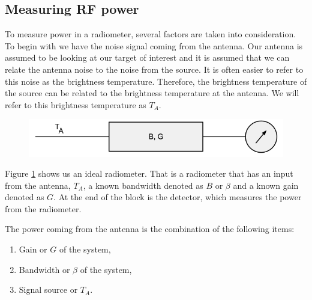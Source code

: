 \subsection{Measuring RF power}

To measure power in a radiometer, several factors are taken into consideration.  To begin with we have the noise signal coming from the antenna.  Our antenna is assumed to be looking at our target of interest and it is assumed that we can relate the antenna noise to the noise from the source.  It is often easier to refer to this noise as the brightness temperature.  Therefore, the brightness temperature of the source can be related to the brightness temperature at the antenna.  We will refer to this brightness temperature as $T_{A}$.  

{\begin{figure}[h!tb] 
\centering
\includegraphics[width=\textwidth]{Images/simple_rad.png}
\label{simplerad}
\end{figure}
}

Figure \ref{simplerad} shows us an ideal radiometer.  That is a radiometer that has an input from the antenna, $T_{A}$, a known bandwidth denoted as $B$ or $\beta$ and a known gain denoted as $G$.  At the end of the block is the detector, which measures the power from the radiometer.


The power coming from the antenna is the combination of the following items:

\begin{enumerate}
\item Gain or $G$ of the system,
\item Bandwidth or $\beta$ of the system,
\item Signal source or $T_{A}$.
\end{enumerate}

